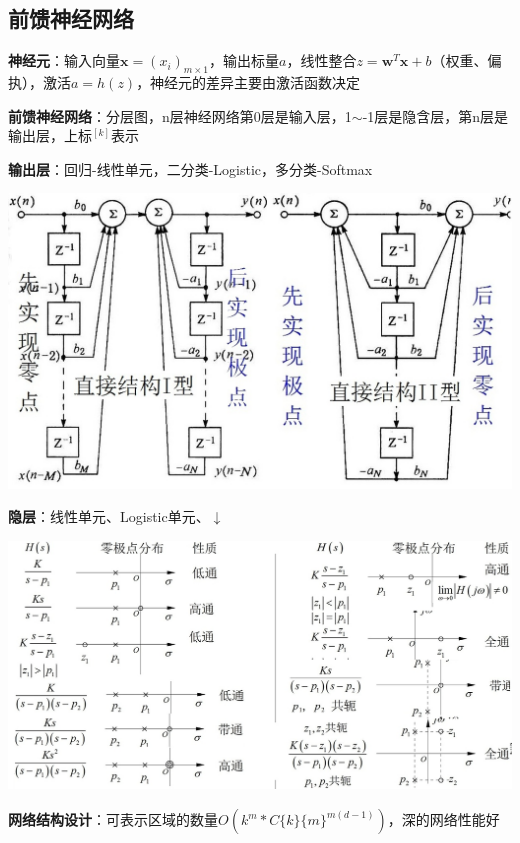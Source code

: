 	\subsection*{前馈神经网络}
	
	\textbf{神经元}：输入向量$\mathbf{x}=(x_i)_{m\times1}$，输出标量$a$，线性整合$z=\mathbf{w}^T\mathbf{x}+b$（权重、偏执），激活$a=h(z)$，神经元的差异主要由激活函数决定
	
	\textbf{前馈神经网络}：分层图，n层神经网络第0层是输入层，1$\sim$-1层是隐含层，第n层是输出层，上标$^[k]$表示
	
	\textbf{输出层}：回归-线性单元，二分类-Logistic，多分类-Softmax
	
	\begin{figurehere}
		\centering
		\includegraphics[width=1\linewidth]{image04}
		\label{fig:image04}
	\end{figurehere}
	\textbf{隐层}：线性单元、Logistic单元、$\downarrow$
	
	\begin{figurehere}
		\centering
		\includegraphics[width=1\linewidth]{image05}
		\label{fig:image05}
	\end{figurehere}
	\textbf{网络结构设计}：可表示区域的数量$O(k^m*C\{k\}\{m\}^{m(d-1)})$，深的网络性能好
	
